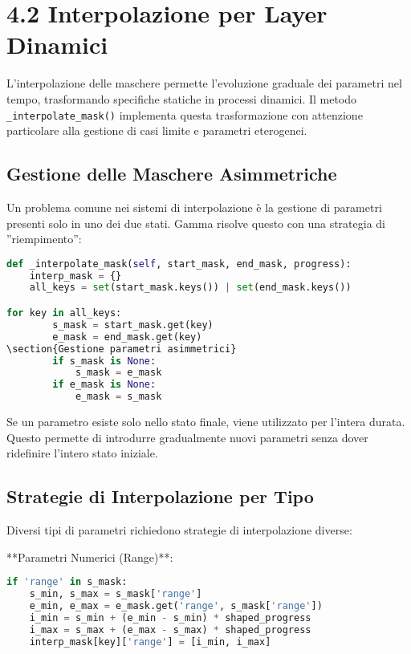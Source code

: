 \section{4.2 Interpolazione per Layer Dinamici}
L'interpolazione delle maschere permette l'evoluzione graduale dei parametri nel tempo, trasformando specifiche statiche in processi dinamici. Il metodo \texttt{\_interpolate\_mask()} implementa questa trasformazione con attenzione particolare alla gestione di casi limite e parametri eterogenei.
\subsection{Gestione delle Maschere Asimmetriche}
Un problema comune nei sistemi di interpolazione è la gestione di parametri presenti solo in uno dei due stati. Gamma risolve questo con una strategia di ''riempimento'':

\begin{lstlisting}[language=Python]
def _interpolate_mask(self, start_mask, end_mask, progress):
    interp_mask = {}
    all_keys = set(start_mask.keys()) | set(end_mask.keys())

for key in all_keys:
        s_mask = start_mask.get(key)
        e_mask = end_mask.get(key)
\section{Gestione parametri asimmetrici}
        if s_mask is None:
            s_mask = e_mask
        if e_mask is None:
            e_mask = s_mask
\end{lstlisting}

Se un parametro esiste solo nello stato finale, viene utilizzato per l'intera durata. Questo permette di introdurre gradualmente nuovi parametri senza dover ridefinire l'intero stato iniziale.
\subsection{Strategie di Interpolazione per Tipo}
Diversi tipi di parametri richiedono strategie di interpolazione diverse:

**Parametri Numerici (Range)**:
\begin{lstlisting}[language=Python]
if 'range' in s_mask:
    s_min, s_max = s_mask['range']
    e_min, e_max = e_mask.get('range', s_mask['range'])
    i_min = s_min + (e_min - s_min) * shaped_progress
    i_max = s_max + (e_max - s_max) * shaped_progress
    interp_mask[key]['range'] = [i_min, i_max]
\end{lstlisting}

